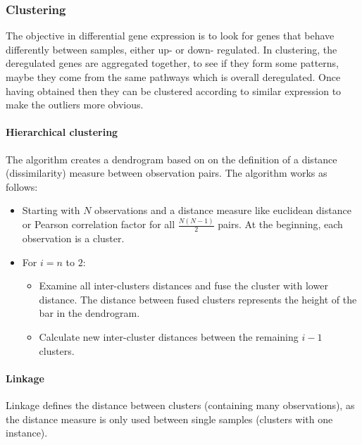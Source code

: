		\subsubsection{Clustering}
		The objective in differential gene expression is to look for genes that behave differently between samples, either up- or down- regulated.
		In clustering, the deregulated genes are aggregated together, to see if they form some patterns, maybe they come from the same pathways which is overall deregulated.
		Once having obtained then they can be clustered according to similar expression to make the outliers more obvious.

			\paragraph{Hierarchical clustering}
			The algorithm creates a dendrogram based on on the definition of a distance (dissimilarity) measure between observation pairs.
			The algorithm works as follows:

				\begin{itemize}
					\item Starting with $N$ observations and a distance measure like euclidean distance or Pearson correlation factor for all $\frac{N(N-1)}{2}$ pairs.
						At the beginning, each observation is a cluster.
					\item For $i =n$ to $2$:

						\begin{itemize}
							\item Examine all inter-clusters distances and fuse the cluster with lower distance.
								The distance between fused clusters represents the height of the bar in the dendrogram.
							\item Calculate new inter-cluster distances between the remaining $i-1$ clusters.
						\end{itemize}

				\end{itemize}

			\paragraph{Linkage}
			Linkage defines the distance between clusters (containing many observations), as the distance measure is only used between single samples (clusters with one instance).

